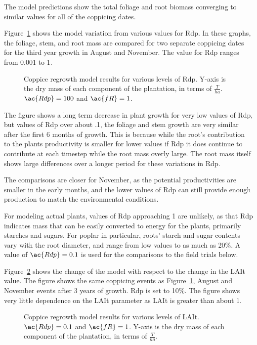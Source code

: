 \documentclass[10pt]{article}
\begin{document}
The model predictions show the total foliage and root biomass
converging to similar values for all of the coppicing dates.

Figure~\ref{fig:rdp} shows the model variation from various values for
\acf{Rdp}.  In these graphs, the foliage, stem, and root mass are
compared for two separate coppicing dates for the third year growth in
August and November.  The value for \ac{Rdp} ranges from 0.001 to 1.

\begin{figure}
  \centering
  
  \caption{Coppice regrowth model results for various levels of \acf{Rdp}.
    Y-axis is the dry mass of each component of the plantation, in
    terms of $\frac{T}{ha}$. $\ac{Rdp}=100$ and $\ac{fR}=1$.}
  \label{fig:rdp}
\end{figure}

The figure shows a long term decrease in plant growth for very low
values of \ac{Rdp}, but values of \ac{Rdp} over about .1, the foliage
and stem growth are very similar after the first 6 months of growth.
This is because while the root's contribution to the plants
productivity is smaller for lower values if \ac{Rdp} it does continue
to contribute at each timestep while the root mass overly large. The
root mass itself shows large differences over a longer period for
these variations in \ac{Rdp}.  

The comparisons are closer for November, as the potential
productivities are smaller in the early months, and the lower values
of \ac{Rdp} can still provide enough production to match the
environmental conditions.

For modeling actual plants, values of \ac{Rdp} approaching 1 are
unlikely, as that \ac{Rdp} indicates mass that can be easily converted
to energy for the plants, primarily starches and sugars.  For poplar
in particular, roots' starch and sugar contents vary with the root
diameter, and range from low values to as much as 20\%.  A value of
$\ac{Rdp}=0.1$ is used for the comparisons to the field trials below. 

Figure~\ref{fig:lai} shows the change of the model with respect to the
change in the \ac{LAIt} value.  The figure shows the same coppicing
events as Figure~\ref{fig:rdp}, August and November events after 3
years of growth.  \ac{Rdp} is set to 10\%.  The figure shows very
little dependence on the \ac{LAIt} parameter as \ac{LAIt} is greater
than about 1.

\begin{figure}
  \centering
  
  \caption{Coppice regrowth model results for various levels of
    \acf{LAIt}.  $\ac{Rdp} = 0.1$ and $\ac{fR}=1$.  Y-axis is the dry
    mass of each component of the plantation, in terms of
    $\frac{T}{ha}$.}
  \label{fig:lai}
\end{figure}
\end{document}
